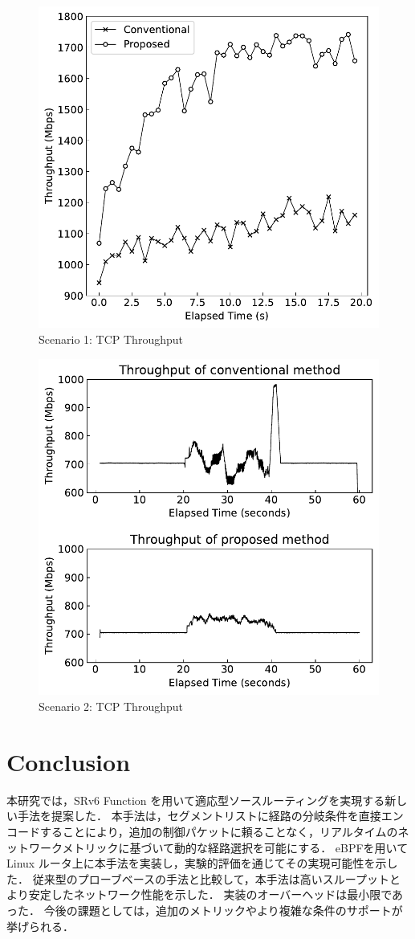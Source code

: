 \documentclass[conference]{IEEEtran}
\begin{document}
\begin{figure}[t]
  \centering
  \includegraphics[width=0.7\linewidth]{./figures/scenario-1.pdf}
  \caption{Scenario 1: TCP Throughput}
  \label{fig:scenario-1}
\end{figure}

\begin{figure}[t]
  \centering
  \includegraphics[width=0.7\linewidth]{./figures/scenario-2.pdf}
  \caption{Scenario 2: TCP Throughput}
  \label{fig:scenario-2}
\end{figure}

\section{Conclusion}

本研究では，SRv6 Function を用いて適応型ソースルーティングを実現する新しい手法を提案した．
本手法は，セグメントリストに経路の分岐条件を直接エンコードすることにより，追加の制御パケットに頼ることなく，リアルタイムのネットワークメトリックに基づいて動的な経路選択を可能にする．
eBPFを用いて Linux ルータ上に本手法を実装し，実験的評価を通じてその実現可能性を示した．
従来型のプローブベースの手法と比較して，本手法は高いスループットとより安定したネットワーク性能を示した．
実装のオーバーヘッドは最小限であった．
今後の課題としては，追加のメトリックやより複雑な条件のサポートが挙げられる．



\end{document}
